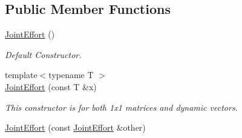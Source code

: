 \subsection*{Public Member Functions}
\begin{DoxyCompactItemize}
\item 
\hyperlink{classow__core_1_1JointEffort_a7a6eb1b97b2b8b3bac294a1c2115b277}{Joint\+Effort} ()\hypertarget{classow__core_1_1JointEffort_a7a6eb1b97b2b8b3bac294a1c2115b277}{}\label{classow__core_1_1JointEffort_a7a6eb1b97b2b8b3bac294a1c2115b277}

\begin{DoxyCompactList}\small\item\em Default Constructor. \end{DoxyCompactList}\item 
{\footnotesize template$<$typename T $>$ }\\\hyperlink{classow__core_1_1JointEffort_ac777fc360d6971d0c87b950f1270074f}{Joint\+Effort} (const T \&x)\hypertarget{classow__core_1_1JointEffort_ac777fc360d6971d0c87b950f1270074f}{}\label{classow__core_1_1JointEffort_ac777fc360d6971d0c87b950f1270074f}

\begin{DoxyCompactList}\small\item\em This constructor is for both 1x1 matrices and dynamic vectors. \end{DoxyCompactList}\item 
\hyperlink{classow__core_1_1JointEffort_adeeeb84404f29fd942e091837a2715c7}{Joint\+Effort} (const \hyperlink{classow__core_1_1JointEffort}{Joint\+Effort} \&other)\hypertarget{classow__core_1_1JointEffort_adeeeb84404f29fd942e091837a2715c7}{}\label{classow__core_1_1JointEffort_adeeeb84404f29fd942e091837a2715c7}


\end{DoxyCompactItemize}
